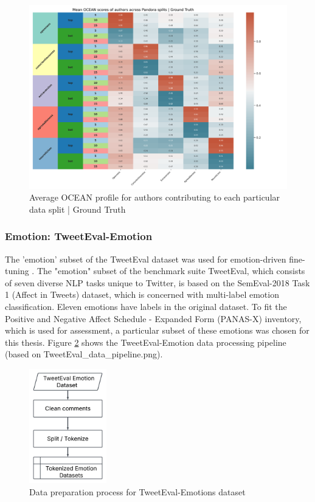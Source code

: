 \documentclass{DESSThesis}
\begin{document}
\begin{figure}[H]
    \centering
    \includegraphics[width=1.0\textwidth]{img/data_eda/10_pandora_splits_heatmap_ground_truth.png}
    \caption{Average OCEAN profile for authors contributing to each particular data split | Ground Truth}
    \label{fig:pandora_splits_ocean_heatmap}
\end{figure}

\subsubsection{Emotion: TweetEval-Emotion}
The 'emotion' subset of the TweetEval dataset was used for emotion-driven fine-tuning \cite{barbieri_tweeteval_2020}. The "emotion" subset of the benchmark suite TweetEval, which consists of seven diverse NLP tasks unique to Twitter, is based on the SemEval-2018 Task 1 (Affect in Tweets) dataset, which is concerned with multi-label emotion classification. Eleven emotions have labels in the original dataset. To fit the Positive and Negative Affect Schedule - Expanded Form (PANAS-X) inventory, which is used for assessment, a particular subset of these emotions was chosen for this thesis. Figure \ref{fig:tweeteval_flowchart} shows the TweetEval-Emotion data processing pipeline (based on TweetEval\_data\_pipeline.png).

\begin{figure}[H]
    \centering
    \includegraphics[width=0.3\textwidth]{img/emotion_flowchart.png}
    \caption{Data preparation process for TweetEval-Emotions dataset}
    \label{fig:tweeteval_flowchart}
\end{figure}
\end{document}
